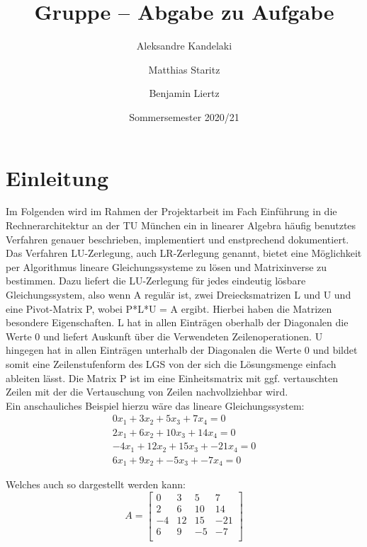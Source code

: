 \documentclass[course=erap]{aspdoc}
\author{⁨Aleksandre Kandelaki \and Matthias Staritz \and Benjamin Liertz}
\date{Sommersemester 2020/21} %
\title{Gruppe \theGroup{} -- Abgabe zu Aufgabe \theNumber}
\begin{document}
\maketitle

\section{Einleitung}

\noindent\hspace*{15mm}%
Im Folgenden wird im Rahmen der Projektarbeit im Fach Einführung
in die Rechnerarchitektur an der TU München ein in linearer Algebra häufig 
benutztes Verfahren genauer beschrieben, implementiert und enstprechend dokumentiert.\\

\noindent\hspace*{15mm}%
Das Verfahren LU-Zerlegung, auch LR-Zerlegung genannt,
 bietet eine Möglichkeit per Algorithmus lineare Gleichungssysteme zu lösen und Matrixinverse zu bestimmen.
Dazu liefert die LU-Zerlegung für jedes eindeutig
 lösbare Gleichungssystem, also wenn A regulär ist,
  zwei Dreiecksmatrizen L und U und eine Pivot-Matrix P,
   wobei P*L*U = A ergibt. Hierbei haben die Matrizen besondere 
   Eigenschaften. L hat in allen Einträgen oberhalb der Diagonalen die Werte 0 und liefert 
   Auskunft über die Verwendeten Zeilenoperationen. U hingegen hat in allen Einträgen unterhalb
    der Diagonalen die Werte 0 und bildet somit eine Zeilenstufenform des LGS von der sich die 
    Lösungsmenge einfach ableiten lässt. Die Matrix P ist im eine Einheitsmatrix mit ggf. 
    vertauschten Zeilen mit der die Vertauschung von Zeilen nachvollziehbar wird. \\
    

\noindent\hspace*{15mm}%
Ein anschauliches Beispiel hierzu wäre das lineare Gleichungssystem:
\begin{eqnarray}
0x_1 + 3x_2 + 5x_3 + 7x_4 = 0 \\
2x_1 + 6x_2 + 10x_3 + 14x_4 = 0\\
-4x_1 + 12x_2 + 15x_3 + -21x_4 = 0\\
6x_1 + 9x_2 + -5x_3 + -7x_4 = 0
\end{eqnarray}



\noindent\hspace*{15mm}%
Welches auch so dargestellt werden kann:
\begin{equation}
A = \begin{bmatrix}
 0	& 3	 & 5  & 7 \\
 2	& 6	 & 10 & 14 \\
-4	& 12 & 15 & -21\\
 6	& 9  & -5 & -7\\
 \end{bmatrix}
\end{equation}
\end{document}
